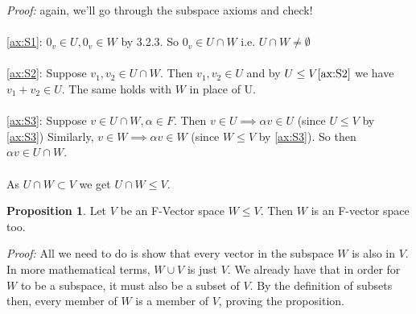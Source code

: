 \documentclass{report}
\theoremstyle{remark}
\theoremstyle{definition}
\theoremstyle{definition}
\theoremstyle{theorem}
\newtheorem{proposition}[theorem]{Proposition}
\begin{document}
\emph{Proof:} again, we'll go through the subspace axioms and check!\\ \\
\ref{ax:S1}: $0_v \in U, 0_v \in W$ by 3.2.3. So $0_v \in U \cap W$ i.e. $U \cap W \neq \emptyset$\\ \\
\ref{ax:S2}: Suppose $v_1, v_2 \in U \cap W$. Then $v_1,v_2 \in U$ and by $U \leq V \eqref{ax:S2}$ we have $v_1 + v_2 \in U$. The same holds with $W$ in place of U.\\ \\
\ref{ax:S3}: Suppose $v \in U \cap W, \alpha \in F$. Then $v \in U \implies \alpha v \in U$ (since $U \leq V$ by \ref{ax:S3}) Similarly, $v \in W \implies \alpha v \in W$ (since $W \leq V$ by \ref{ax:S3}). So then $\alpha v \in U \cap W$. \\ \\
As $U \cap W \subset V$ we get $U \cap W \leq V$.
\begin{proposition}
Let $V$ be an F-Vector space $W \leq V$. Then $W$ is an F-vector space too.
\end{proposition}
\emph{Proof:} All we need to do is show that every vector in the subspace $W$ is also in $V$. In more mathematical terms, $W \cup V$ is just $V$. We already have that in order for $W$ to be a subspace, it must also be a subset of $V$. By the definition of subsets then, every member of $W$ is a member of $V$, proving the proposition.
\end{document}
